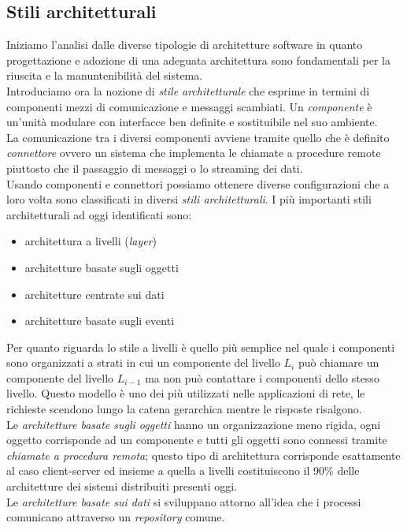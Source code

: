 \subsection{Stili architetturali}
Iniziamo l'analisi dalle diverse tipologie di architetture software in quanto progettazione e adozione di una adeguata architettura sono fondamentali per la riuscita e la manuntenibilità del sistema.\\
Introduciamo ora la nozione di \emph{stile architetturale} che esprime in termini di componenti mezzi di comunicazione e messaggi scambiati. Un \emph{componente} è un'unità modulare con interfacce ben definite e sostituibile nel suo ambiente.\\
La comunicazione tra i diversi componenti avviene tramite quello che è definito \emph{connettore} ovvero un sistema che implementa le chiamate a procedure remote piuttosto che il passaggio di messaggi o lo streaming dei dati.\\
Usando componenti e connettori possiamo ottenere diverse configurazioni che a loro volta sono classificati in diversi \emph{stili architetturali}. I più importanti stili architetturali ad oggi identificati sono:
\begin{itemize}
\item architettura a livelli (\emph{layer})
\item architetture basate sugli oggetti
\item architetture centrate sui dati
\item architetture basate sugli eventi
\end{itemize}
Per quanto riguarda lo stile a livelli è quello più semplice nel quale i componenti sono organizzati a strati in cui un componente del livello $L_i$ può chiamare un componente del livello $L_{i-1}$ ma non può contattare i componenti dello stesso livello. Questo modello è uno dei più utilizzati nelle applicazioni di rete, le richieste scendono lungo la catena gerarchica mentre le risposte risalgono.\\
Le \emph{architetture basate sugli oggetti} hanno un organizzazione meno rigida, ogni oggetto corrisponde ad un componente e tutti gli oggetti sono connessi tramite \emph{chiamate a procedura remota}; questo tipo di architettura corrisponde esattamente al caso client-server ed insieme a quella a livelli costituiscono il 90\% delle architetture dei sistemi distribuiti presenti oggi.\\
Le \emph{architetture basate sui dati} si sviluppano attorno all'idea che i processi comunicano attraverso un \emph{repository} comune.\\
